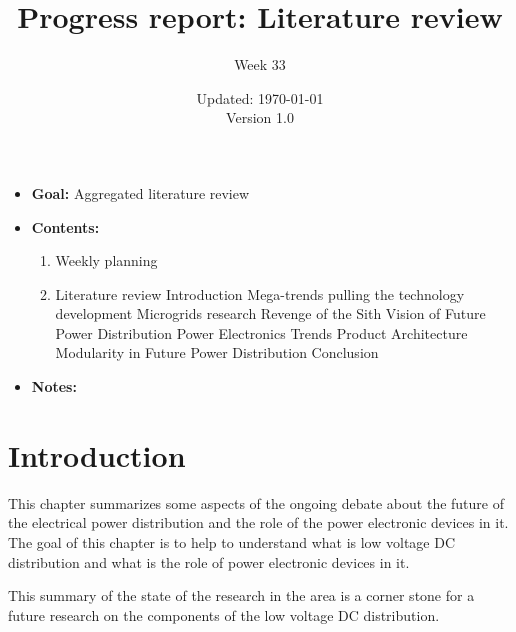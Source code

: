 \documentclass[]{scrartcl}
\title{Progress report: Literature review}
\subtitle{Week 33}
\date{Updated: \today\\Version 1.0}
\begin{document}
	\begingroup
	\let\center\flushleft
	\let\endcenter\endflushleft
	\maketitle
	\endgroup
	
	\section*{}
	\begin{itemize}
		\item \textbf{Goal:} \subitem Aggregated literature review
		
		\item \textbf{Contents:}
		\begin{enumerate}
			\item Weekly planning
			\item Literature review
			\subitem Introduction
			\subitem Mega-trends pulling the technology development
			\subitem Microgrids research
			\subitem Revenge of the Sith 
			\subitem Vision of Future Power Distribution
			\subitem Power Electronics Trends
			\subitem Product Architecture
			\subitem Modularity in Future Power Distribution
			\subitem Conclusion 
		\end{enumerate}
		\item \textbf{Notes:}
		\subitem 
		\subitem 
		\subitem
	\end{itemize}
	\newpage

\section{Introduction}

This chapter summarizes some aspects of the ongoing debate about the future of the electrical power distribution and the role of the power electronic devices in it. The goal of this chapter is to help to understand what is low voltage DC distribution and what is the role of power electronic devices in it. 

This summary of the state of the research in the area is a corner stone for a future research on the components of the low voltage DC distribution. 
\end{document}
